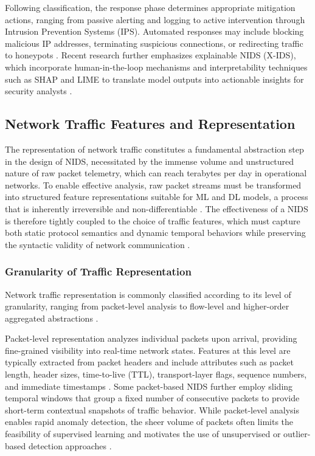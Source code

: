 Following classification, the response phase determines appropriate mitigation actions, ranging from passive alerting and logging to active intervention through Intrusion Prevention Systems (IPS). Automated responses may include blocking malicious IP addresses, terminating suspicious connections, or redirecting traffic to honeypots \cite{corona2013adversarial, bountakas2023defense}. Recent research further emphasizes explainable NIDS (X-IDS), which incorporate human-in-the-loop mechanisms and interpretability techniques such as SHAP and LIME to translate model outputs into actionable insights for security analysts \cite{neupane2022explainable}.

\subsection{Network Traffic Features and Representation}

The representation of network traffic constitutes a fundamental abstraction step in the design of NIDS, necessitated by the immense volume and unstructured nature of raw packet telemetry, which can reach terabytes per day in operational networks. To enable effective analysis, raw packet streams must be transformed into structured feature representations suitable for ML and DL models, a process that is inherently irreversible and non-differentiable \cite{10005100, he2023adversarial}. The effectiveness of a NIDS is therefore tightly coupled to the choice of traffic features, which must capture both static protocol semantics and dynamic temporal behaviors while preserving the syntactic validity of network communication \cite{zhang2022adversarial}.

\subsubsection{Granularity of Traffic Representation}

Network traffic representation is commonly classified according to its level of granularity, ranging from packet-level analysis to flow-level and higher-order aggregated abstractions \cite{hashemi2020enhancing, he2023adversarial}.

Packet-level representation analyzes individual packets upon arrival, providing fine-grained visibility into real-time network states. Features at this level are typically extracted from packet headers and include attributes such as packet length, header sizes, time-to-live (TTL), transport-layer flags, sequence numbers, and immediate timestamps \cite{hashemi2020enhancing}. Some packet-based NIDS further employ sliding temporal windows that group a fixed number of consecutive packets to provide short-term contextual snapshots of traffic behavior. While packet-level analysis enables rapid anomaly detection, the sheer volume of packets often limits the feasibility of supervised learning and motivates the use of unsupervised or outlier-based detection approaches \cite{he2023adversarial}.

